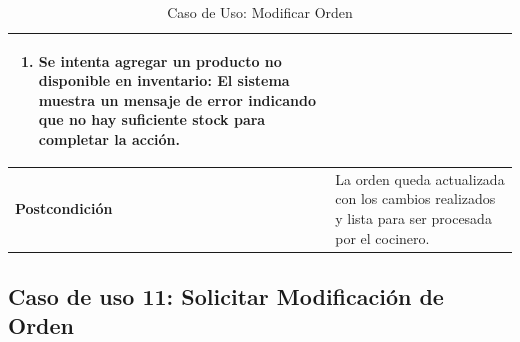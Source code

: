 \documentclass{article}
\begin{document}
\begin{table}[H]
\begin{tabular}{|p{4cm}|p{11cm}|}
\begin{enumerate}
        \item Se intenta agregar un producto no disponible en inventario: El sistema muestra un mensaje de error indicando que no hay suficiente stock para completar la acción.
    \end{enumerate} \\ \hline
    \textbf{Postcondición}      & La orden queda actualizada con los cambios realizados y lista para ser procesada por el cocinero. \\ \hline
    \end{tabular}
    \caption{Caso de Uso: Modificar Orden}
    \label{tab:modificar_orden}
\end{table}    

\subsection{Caso de uso 11: Solicitar Modificación de Orden}
\end{document}
